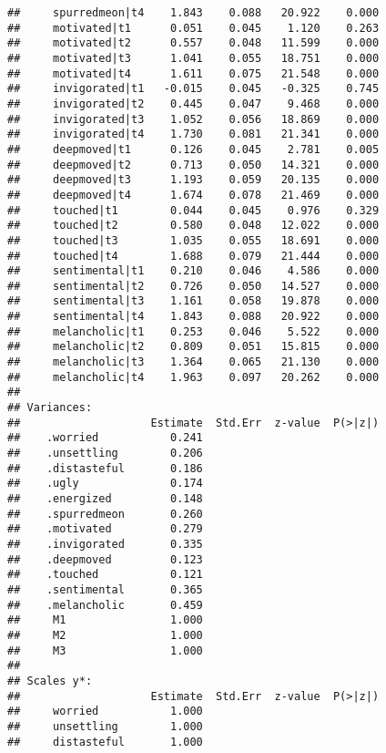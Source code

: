 \documentclass[
]{article}
\begin{document}
\begin{verbatim}
##     spurredmeon|t4    1.843    0.088   20.922    0.000
##     motivated|t1      0.051    0.045    1.120    0.263
##     motivated|t2      0.557    0.048   11.599    0.000
##     motivated|t3      1.041    0.055   18.751    0.000
##     motivated|t4      1.611    0.075   21.548    0.000
##     invigorated|t1   -0.015    0.045   -0.325    0.745
##     invigorated|t2    0.445    0.047    9.468    0.000
##     invigorated|t3    1.052    0.056   18.869    0.000
##     invigorated|t4    1.730    0.081   21.341    0.000
##     deepmoved|t1      0.126    0.045    2.781    0.005
##     deepmoved|t2      0.713    0.050   14.321    0.000
##     deepmoved|t3      1.193    0.059   20.135    0.000
##     deepmoved|t4      1.674    0.078   21.469    0.000
##     touched|t1        0.044    0.045    0.976    0.329
##     touched|t2        0.580    0.048   12.022    0.000
##     touched|t3        1.035    0.055   18.691    0.000
##     touched|t4        1.688    0.079   21.444    0.000
##     sentimental|t1    0.210    0.046    4.586    0.000
##     sentimental|t2    0.726    0.050   14.527    0.000
##     sentimental|t3    1.161    0.058   19.878    0.000
##     sentimental|t4    1.843    0.088   20.922    0.000
##     melancholic|t1    0.253    0.046    5.522    0.000
##     melancholic|t2    0.809    0.051   15.815    0.000
##     melancholic|t3    1.364    0.065   21.130    0.000
##     melancholic|t4    1.963    0.097   20.262    0.000
## 
## Variances:
##                    Estimate  Std.Err  z-value  P(>|z|)
##    .worried           0.241                           
##    .unsettling        0.206                           
##    .distasteful       0.186                           
##    .ugly              0.174                           
##    .energized         0.148                           
##    .spurredmeon       0.260                           
##    .motivated         0.279                           
##    .invigorated       0.335                           
##    .deepmoved         0.123                           
##    .touched           0.121                           
##    .sentimental       0.365                           
##    .melancholic       0.459                           
##     M1                1.000                           
##     M2                1.000                           
##     M3                1.000                           
## 
## Scales y*:
##                    Estimate  Std.Err  z-value  P(>|z|)
##     worried           1.000                           
##     unsettling        1.000                           
##     distasteful       1.000                           

\end{verbatim}
\end{document}
